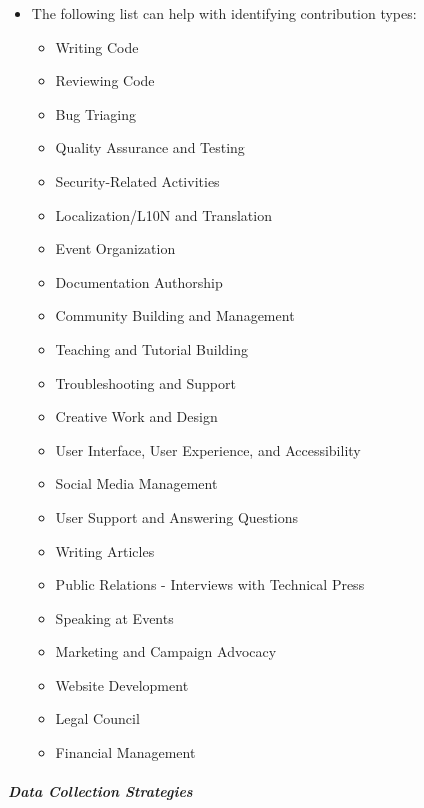 \begin{itemize}
\tightlist
\item
  The following list can help with identifying contribution types:

  \begin{itemize}
  \tightlist
  \item
    Writing Code
  \item
    Reviewing Code
  \item
    Bug Triaging
  \item
    Quality Assurance and Testing
  \item
    Security-Related Activities
  \item
    Localization/L10N and Translation
  \item
    Event Organization
  \item
    Documentation Authorship
  \item
    Community Building and Management
  \item
    Teaching and Tutorial Building
  \item
    Troubleshooting and Support
  \item
    Creative Work and Design
  \item
    User Interface, User Experience, and Accessibility
  \item
    Social Media Management
  \item
    User Support and Answering Questions
  \item
    Writing Articles
  \item
    Public Relations - Interviews with Technical Press
  \item
    Speaking at Events
  \item
    Marketing and Campaign Advocacy
  \item
    Website Development
  \item
    Legal Council
  \item
    Financial Management
  \end{itemize}
\end{itemize}

\hypertarget{data-collection-strategies}{%
\subparagraph{Data Collection
Strategies}\label{data-collection-strategies}}

